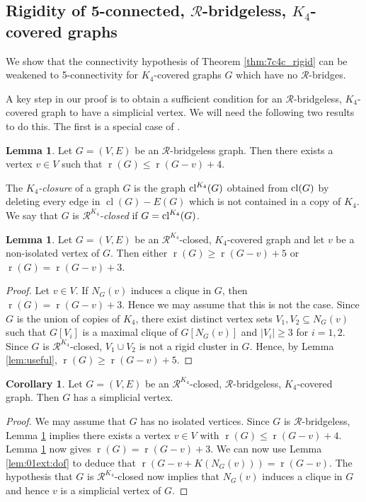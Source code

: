 \documentclass[11pt,a4paper]{article}
\theoremstyle{definition}
\newtheorem{lemma}[theorem]{Lemma}
\newtheorem{corollary}[theorem]{Corollary}
\DeclareMathOperator{\rr}{r}
\DeclareMathOperator{\cl}{cl}
\newcommand{\cR}{\mathcal{R}}
\begin{document}
\subsection{Rigidity of 5-connected, $\mathcal{R}$-bridgeless, $K_4$-covered graphs} \label{sec:rigidK4}

We show that the connectivity hypothesis of Theorem \ref{thm:7c4c_rigid}  can be weakened to 5-connectivity for  $K_4$-covered graphs $G$ which have no   $\mathcal{R}$-bridges.

A key step in our proof is to obtain a sufficient condition for an $\mathcal{R}$-bridgeless, $K_4$-covered graph to have a simplicial vertex. %
We will need  the following two results to do this. The first is a special case of \cite[Lemma 5.6]{CJT}.
\begin{lemma}\cite{CJT}\label{lem:cyclic:vertex}
    Let $G=(V,E)$ be an $\mathcal{R}$-bridgeless graph. Then there exists a vertex $v\in V$ such that $\rr(G)\leq \rr(G-v)+4$.
\end{lemma}

The {\em $K_4$-closure} of a graph $G$ is the graph  ${\rm cl}^{K_4}(G)$  obtained from ${\rm cl}(G)$ by deleting every edge in $\cl(G)-E(G)$ which is not contained in a copy of $K_4$.  We say 
that $G$ is 
{\it $\mathcal{R}^{K_4}$-closed} if $G={\rm cl}^{K_4}(G)$.  




\begin{lemma}\label{lem:3or5}
    Let $G=(V,E)$ be an $\mathcal{R}^{K_4}$-closed, 
    $K_4$-covered graph 
    and let $v$ be a non-isolated vertex of $G$. Then either $\rr(G)\geq \rr(G-v)+5$ or $\rr(G)=\rr(G-v)+3$.
\end{lemma}
\begin{proof}
    Let $v\in V$. If $N_G(v)$ induces a clique in $G$, then $\rr(G)=\rr(G-v)+3$. Hence we may assume that this is not the case. Since $G$ is the union of copies of $K_4$, there exist distinct vertex sets $V_1,V_2\subseteq N_G(v)$ such that $G[V_i]$ is a maximal clique of $G[N_G(v)]$ and $|V_i|\geq 3$ for $i=1,2$. Since $G$ is $\mathcal{R}^{K_4}$-closed, $V_1\cup V_2$ is not a rigid cluster in $G$. Hence, by Lemma \ref{lem:useful}, $\rr(G)\geq \rr(G-v)+5$.
\end{proof}


\begin{corollary}\label{coro:simplicial}
    Let $G=(V,E)$ be an $\mathcal{R}^{K_4}$-closed, $\cR$-bridgeless, 
    $K_4$-covered graph. Then $G$ has a simplicial vertex.
\end{corollary}
\begin{proof}
    We may assume that $G$ has no isolated vertices. Since $G$ is  $\cR$-bridgeless, Lemma \ref{lem:cyclic:vertex} implies there exists a vertex $v\in V$ with $\rr(G)\leq \rr(G-v)+4$. Lemma \ref{lem:3or5} now gives $\rr(G)= \rr(G-v)+3$. We can now use  Lemma \ref{lem:01ext:dof} to deduce that $\rr(G-v+K(N_G(v)))=\rr(G-v)$.  
    The hypothesis that $G$ is $\mathcal{R}^{K_4}$-closed now implies that $N_G(v)$ induces a clique in $G$ and hence $v$ is a simplicial vertex of $G$.
\end{proof}
\end{document}
